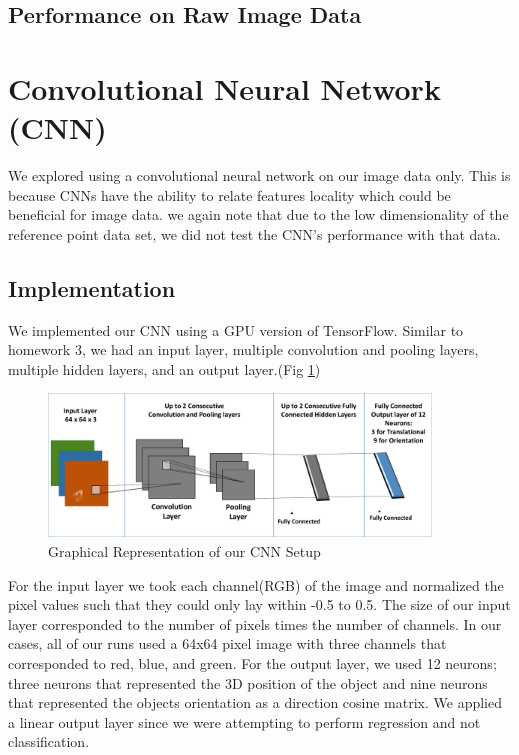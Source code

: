 \documentclass[journal]{IEEEtran}
\begin{document}
\subsection{Performance on Raw Image Data}

\section{Convolutional Neural Network (CNN)}
We explored using a convolutional neural network on our image data only. This is because CNNs have the ability to relate features locality which could be beneficial for image data. we again note that due to the low dimensionality of the reference point data set, we did not test the CNN's performance with that data. 
\subsection{Implementation}
We implemented our CNN using a GPU version of TensorFlow. Similar to homework 3, we had an input layer, multiple convolution and pooling layers, multiple hidden layers, and an output layer.(Fig \ref{Fig:CNN_ARCH})

\begin{figure}
	\centering\hspace{0 ex}
	\includegraphics[width=4in]{CNN_ARCH}
	\caption{Graphical Representation of our CNN Setup}
	\label{Fig:CNN_ARCH}
\end{figure}

For the input layer we took each channel(RGB) of the image and normalized the pixel values such that they could only lay within -0.5 to 0.5. The size of our input layer corresponded to the number of pixels times the number of channels. In our cases, all of our runs used a 64x64 pixel image with three channels that corresponded to red, blue, and green. For the output layer, we used 12 neurons; three neurons that represented the 3D position of the object and nine neurons that represented the objects orientation as a direction cosine matrix. We applied a linear output layer since we were attempting to perform regression and not classification. 
\end{document}
